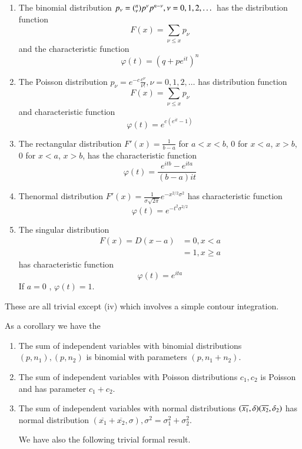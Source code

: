 \begin{theorem}\label{chap2:sec7:thm17}  %
\begin{enumerate}[\rm (i)]
\item The  binomial distribution $p_\nu=(^n_\nu) p^\nu p^{n-\nu},
  \nu=0, 1,\break 2, \dots$ has the distribution function
  $$
  F(x)=  \sum\limits_{\nu \leq x} p_\nu
  $$
  and the characteristic function 
  $$
  \varphi (t) = (q+pe^{it})^n
  $$
\item The Poisson distribution $p_\nu =e^{-c} \frac {c^{\nu}} {\nu !}
  , \nu =0 , 1, 2, \dots$ has distribution function
  $$ 
  F(x)= \sum\limits_{\nu \leq x} p_\nu 
  $$
  and characteristic function 
  $$ 
  \varphi (t)= e^{c(e^{it}-1)}
  $$
\item The rectangular distribution $F' (x)= \frac{1} {b-a}$ for $a<
  x< b$, 0 for $x < a $,  $x > b$, 0 for $x < a$,   $x > b$,  has the
  characteristic function  
  $$ 
  \varphi (t) =\frac{e^{itb}-e^{ita}} {(b-a) it} 
  $$
\item The\pageoriginale normal distribution $F'(x)=\frac{1}{\sigma \sqrt {2 \pi}}
  e^{-x^{2 / 2} \sigma^2}$ has characteristic function  
  $$
  \varphi(t)=e^{-t^2 \sigma^{2/2}}
  $$
\item The singular distribution
  \begin{align*}
    F(x) = D(x-a) & = 0, x < a\\
    & = 1, x \ge a
  \end{align*}
  has characteristic function 
   $$
   \varphi(t) = e^{ita}
   $$
   If $a = 0$ , $\varphi (t) = 1$. 
\end{enumerate}
\end{theorem}
These are all trivial except (iv) which involves a simple contour integration.

As a corollary we have the 

\begin{theorem}\label{chap2:sec7:thm18}  %
\begin{enumerate}[\rm (i)]
\item The sum of independent variables with binomial distributions
  $(p, n_1), (p, n_2)$ is binomial with parameters $(p, n_1 + n_2)$.  
\item  The sum of independent variables with Poisson distributions
  $c_1, c_2$ is Poisson and has parameter $c_1 + c_2$. 

\item The sum of independent variables with normal
  distributions $(\overline{x_1}, \delta)\break (\overline{x_2}, \delta_2)$
  has normal distribution $(\overline{x_1}+\overline{x_2}, \sigma),
  \sigma^2 = \sigma_1^2 + \sigma_2^2$.  

  We have also the following trivial formal result.
\end{enumerate} 
\end{theorem}

